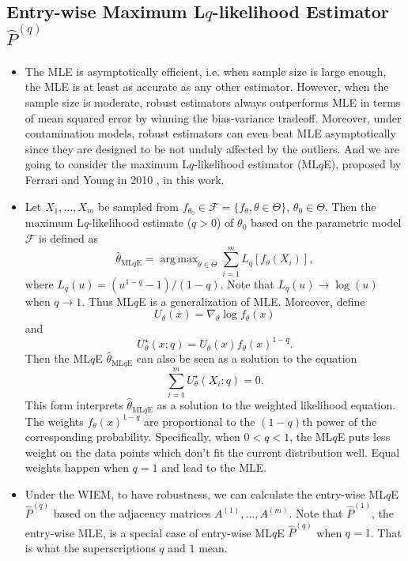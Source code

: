 \documentclass[a4paper]{article}
\DeclareMathOperator*{\argmax}{arg\,max}
\renewcommand{\hat}{\widehat}
\begin{document}
\subsection{Entry-wise Maximum L$q$-likelihood Estimator $\hat{P}^{(q)}$}
\begin{itemize}
\item The MLE is asymptotically efficient, i.e. when sample size is large enough, the MLE is at least as accurate as any other estimator. However, when the sample size is moderate, robust estimators always outperforms MLE in terms of mean squared error by winning the bias-variance tradeoff. Moreover, under contamination models, robust estimators can even beat MLE asymptotically since they are designed to be not unduly affected by the outliers. And we are going to consider the maximum L$q$-likelihood estimator (ML$q$E), proposed by Ferrari and Young in 2010 \cite{ferrari2010}, in this work.
\item Let $X_1, \dotsc, X_m$ be sampled from $f_{\theta_0} \in \mathcal{F} = \{ f_{\theta}, \theta \in \Theta \}$, $\theta_0 \in \Theta$. Then the maximum L$q$-likelihood estimate ($q > 0$) of $\theta_0$ based on the parametric model $\mathcal{F}$ is defined as
\[
	\hat{\theta}_{\mathrm{ML}q\mathrm{E}} = \argmax_{\theta \in \Theta} \sum_{i=1}^m L_q[f_{\theta}(X_i)],
\]
where $L_q(u) = (u^{1-q} - 1)/(1- q)$.
Note that $L_q(u) \to \log(u)$ when $q \to 1$. Thus ML$q$E is a generalization of MLE.
Moreover, define
\[
	U_{\theta}(x) = \nabla_{\theta} \log f_{\theta}(x)
\]
and
\[
	U^{\star}_{\theta}(x; q) = U_{\theta}(x) f_{\theta}(x)^{1-q}.
\]
Then the ML$q$E $\hat{\theta}_{\mathrm{ML}q\mathrm{E}}$ can also be seen as a solution to the equation
\[
	\sum_{i=1}^m U^{\star}_{\theta}(X_i; q) = 0.
\]
This form interprets $\hat{\theta}_{\mathrm{ML}q\mathrm{E}}$ as a solution to the weighted likelihood equation. The weights $f_{\theta}(x)^{1-q}$ are proportional to the $(1-q)$th power of the corresponding probability. Specifically, when $0 < q < 1$, the ML$q$E puts less weight on the data points which don't fit the current distribution well. Equal weights happen when $q=1$ and lead to the MLE.
\item Under the WIEM, to have robustness, we can calculate the entry-wise ML$q$E $\hat{P}^{(q)}$ based on the adjacency matrices $A^{(1)}, \dotsc, A^{(m)}$. Note that $\hat{P}^{(1)}$, the entry-wise MLE, is a special case of entry-wise ML$q$E $\hat{P}^{(q)}$ when $q = 1$. That is what the superscriptions $q$ and $1$ mean.
\end{itemize}
\end{document}
